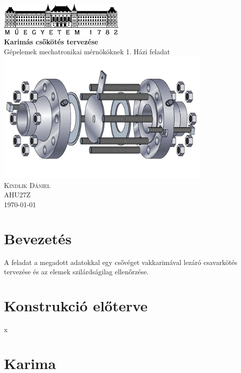 \documentclass[10pt, a4paper]{article}
\begin{document}
	\begin{titlepage}
		\centering
		\includegraphics[width=175pt]{ BMElogo.png } \\
		\vspace*{2cm}
		{\Huge \bfseries Karimás csőkötés tervezése} \\
		\vspace{0.5cm}
		{\Large Gépelemek mechatronikai mérnököknek 1. Házi feladat} \\
		\vspace{0.5cm}
		\includegraphics[width=300pt, angle=-90]{ karima_rajz.png } \\
		\vspace{1cm}
		{\Large \scshape Kindlik Dániel} \\
		\vspace{0.5cm}
		AHU27Z \\
		\vfill
		{\large \today} \\
	\end{titlepage}
	\thispagestyle{empty}
	\tableofcontents
	\newpage
	\setcounter{page}{3}
	\section*{Bevezetés}
	A feladat a megadott adatokkal egy csővéget vakkarimával lezáró csavarkötés tervezése és az elemek szilárdságilag
	ellenőrzése.
	\section{Konstrukció előterve}
	x
	\newpage
	\section{Karima}
\end{document}
